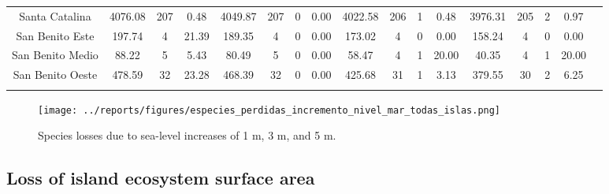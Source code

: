 \documentclass{article} %
\begin{document}
\begin{table}
\begin{adjustwidth}{-2.6cm}{}
\begin{footnotesize}
\begin{tabular}{ccccccccccccccccc}
Santa Catalina &   4076.08 &  207 &   0.48 &   4049.87 &  207 &    0 &   0.00 &   4022.58 &  206 &    1 &   0.48 &   3976.31 &  205 &      2 &    0.97 \\
San Benito Este &    197.74 &    4 &  21.39 &    189.35 &    4 &    0 &   0.00 &    173.02 &    4 &    0 &   0.00 &    158.24 &    4 &      0 &    0.00 \\
San Benito Medio &     88.22 &    5 &   5.43 &     80.49 &    5 &    0 &   0.00 &     58.47 &    4 &    1 &  20.00 &     40.35 &    4 &      1 &   20.00 \\
San Benito Oeste &    478.59 &   32 &  23.28 &    468.39 &   32 &    0 &   0.00 &    425.68 &   31 &    1 &   3.13 &    379.55 &   30 &      2 &    6.25 \\
\hline 
\label{Tab:tab4} 
\end{tabular} 
\end{footnotesize}
\end{adjustwidth}
\end{table}


\begin{figure}
  \begin{center}
  \texttt{[image: ../reports/figures/especies\_perdidas\_incremento\_nivel\_mar\_todas\_islas.png]}
  \caption{Species losses due to sea-level increases of 1 m, 3 m, and 5 m.}
  \label{fig:species_losses}
  \end{center}
\end{figure}

\subsection{Loss of island ecosystem surface area}
\end{document}
